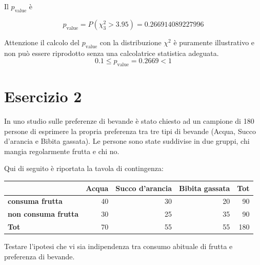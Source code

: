 \documentclass[
  11pt,
]{book}
\theoremstyle{mytheoremstyle}
\theoremstyle{mydefstyle}
\newenvironment{sol}
  {
  \begin{tcolorbox}[enhanced,breakable,arc=0.1mm,boxrule=1pt,colback=white,colframe=iblue,
  title=\bf \fontfamily{lmss}\selectfont \hspace{.5 cm} Soluzione,drop fuzzy shadow]

}{
\end{tcolorbox}
  }
\begin{document}
\begin{sol}
Il \(p_{\text{value}}\) è

\[ p_{\text{value}} = P(\chi^2_{3}>3.95)=0.266914089227996 \]

Attenzione il calcolo del \(p_\text{value}\) con la distribuzione \(\chi^2\) è puramente illustrativo e non può essere riprodotto senza una calcolatrice statistica adeguata.\[
 0.1 \leq p_\text{value}= 0.2669 < 1 
\]

\end{sol}

\section{Esercizio 2}\label{esercizio-2-1}

In uno studio sulle preferenze di bevande è stato chiesto ad un campione di 180 persone di esprimere la propria preferenza tra tre tipi di bevande (Acqua, Succo d'arancia e Bibita gassata). Le persone sono state suddivise in due gruppi, chi mangia regolarmente frutta e chi no.

Qui di seguito è riportata la tavola di contingenza:

\begin{table}[H]
\centering
\begin{tabular}{>{}lrrrr}
\toprule
  & Acqua & Succo d'arancia & Bibita gassata & Tot\\
\midrule
\textbf{consuma frutta} & 40 & 30 & 20 & 90\\
\textbf{non consuma frutta} & 30 & 25 & 35 & 90\\
\textbf{Tot} & 70 & 55 & 55 & 180\\
\bottomrule
\end{tabular}
\end{table}

Testare l'ipotesi che vi sia indipendenza tra consumo abituale di frutta e preferenza di bevande.
\end{document}

